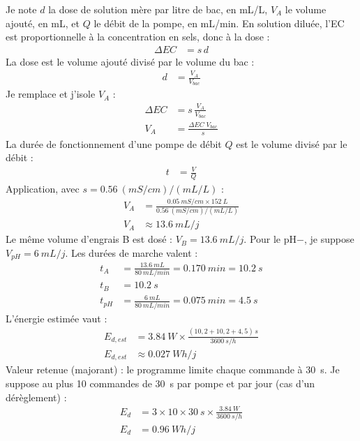 \begin{demonstration}
Je note $d$ la dose de solution mère par litre de bac, en mL/L, $V_A$ le volume ajouté, en mL, et $Q$ le débit de la pompe, en mL/min. En solution diluée, l'EC est proportionnelle à la concentration en sels, donc à la dose :
\begin{align*}
\Delta EC &= s\, d
\end{align*}
La dose est le volume ajouté divisé par le volume du bac :
\begin{align*}
d &= \frac{V_A}{V_{bac}}
\end{align*}
Je remplace et j'isole $V_A$ :
\begin{align*}
\Delta EC &= s\,\frac{V_A}{V_{bac}}\\
V_A &= \frac{\Delta EC\; V_{bac}}{s}
\end{align*}
La durée de fonctionnement d'une pompe de débit $Q$ est le volume divisé par le débit :
\begin{align*}
t &= \frac{V}{Q}
\end{align*}
Application, avec $s = \qty{0,56}{(mS/cm)/(mL/L)}$ :
\begin{align*}
V_A &= \frac{\qty{0,05}{mS/cm} \times \qty{152}{L}}{\qty{0,56}{(mS/cm)/(mL/L)}}\\
V_A &\approx \qty{13,6}{mL/j}
\end{align*}
Le même volume d'engrais B est dosé : $V_B = \qty{13,6}{mL/j}$. Pour le pH$-$, je suppose $V_{pH} = \qty{6}{mL/j}$. Les durées de marche valent :
\begin{align*}
t_A &= \frac{\qty{13,6}{mL}}{\qty{80}{mL/min}} = \qty{0,170}{min} = \qty{10,2}{s}\\
t_B &= \qty{10,2}{s}\\
t_{pH} &= \frac{\qty{6}{mL}}{\qty{80}{mL/min}} = \qty{0,075}{min} = \qty{4,5}{s}
\end{align*}
L'énergie estimée vaut :
\begin{align*}
E_{d,est} &= \qty{3,84}{W} \times \frac{(10{,}2 + 10{,}2 + 4{,}5)\,\unit{s}}{\qty{3600}{s/h}}\\
E_{d,est} &\approx \qty{0,027}{Wh/j}
\end{align*}
Valeur retenue (majorant) : le programme limite chaque commande à \qty{30}{s}. Je suppose au plus 10 commandes de \qty{30}{s} par pompe et par jour (cas d'un dérèglement) :
\begin{align*}
E_d &= 3 \times 10 \times \qty{30}{s} \times \frac{\qty{3,84}{W}}{\qty{3600}{s/h}}\\
E_d &= \qty{0,96}{Wh/j}
\end{align*}
\end{demonstration}

